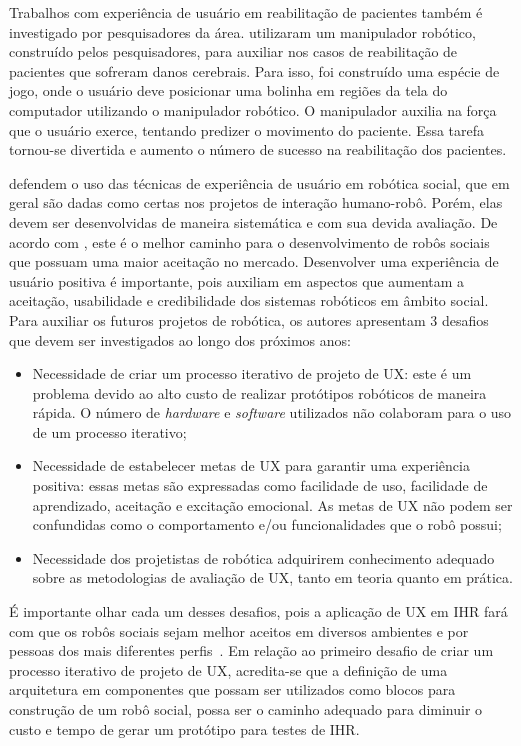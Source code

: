Trabalhos com experiência de usuário em reabilitação de pacientes também é investigado por pesquisadores da área. \textcite{shirzad:2016} utilizaram um manipulador robótico, construído pelos pesquisadores, para auxiliar nos casos de reabilitação de pacientes que sofreram danos cerebrais. Para isso, foi construído uma espécie de jogo, onde o usuário deve posicionar uma bolinha em regiões da tela do computador utilizando o manipulador robótico. O manipulador auxilia na força que o usuário exerce, tentando predizer o movimento do paciente. Essa tarefa tornou-se divertida e aumento o número de sucesso na reabilitação dos pacientes.

\textcite{lindblom:2016} defendem o uso das técnicas de experiência de usuário em robótica social, que em geral são dadas como certas nos projetos de interação humano-robô. Porém, elas devem ser desenvolvidas de maneira sistemática e com sua devida avaliação. De acordo com \textcite{lindblom:2016}, este é o melhor caminho para o desenvolvimento de robôs sociais que possuam uma maior aceitação no mercado. Desenvolver uma experiência de usuário positiva é importante, pois auxiliam em aspectos que aumentam a aceitação, usabilidade e credibilidade dos sistemas robóticos em âmbito social. Para auxiliar os futuros projetos de robótica, os autores apresentam 3 desafios que devem ser investigados ao longo dos próximos anos:

\begin{itemize}
    \item Necessidade de criar um processo iterativo de projeto de UX: este é um problema devido ao alto custo de realizar protótipos robóticos de maneira rápida. O número de \emph{hardware} e \emph{software} utilizados não colaboram para o uso de um processo iterativo;
    \item Necessidade de estabelecer metas de UX para garantir uma experiência positiva: essas metas são expressadas como facilidade de uso, facilidade de aprendizado, aceitação e excitação emocional. As metas de UX não podem ser confundidas como o comportamento e/ou funcionalidades que o robô possui;
    \item Necessidade dos projetistas de robótica adquirirem conhecimento adequado sobre as metodologias de avaliação de UX, tanto em teoria quanto em prática.
\end{itemize}

É importante olhar cada um desses desafios, pois a aplicação de UX em IHR fará com que os robôs sociais sejam melhor aceitos em diversos ambientes e por pessoas dos mais diferentes perfis~\cite{lindblom:2016}. Em relação ao primeiro desafio de criar um processo iterativo de projeto de UX, acredita-se que a definição de uma arquitetura em componentes que possam ser utilizados como blocos para construção de um robô social, possa ser o caminho adequado para diminuir o custo e tempo de gerar um protótipo para testes de IHR.

